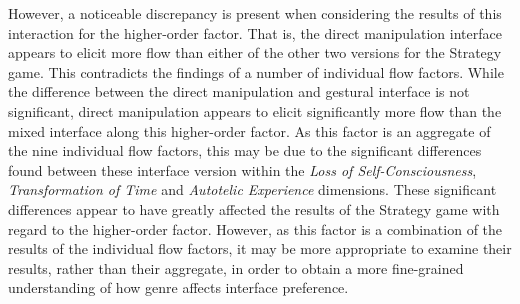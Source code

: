 However, a noticeable discrepancy is present when considering the results of this interaction for the higher-order factor. That is, the direct manipulation interface appears to elicit more flow than either of the other two versions for the Strategy game. This contradicts the findings of a number of individual flow factors. While the difference between the direct manipulation and gestural interface is not significant, direct manipulation appears to elicit significantly more flow than the mixed interface along this higher-order factor. As this factor is an aggregate of the nine individual flow factors, this may be due to the significant differences found between these interface version within the \emph{Loss of Self-Consciousness}, \emph{Transformation of Time} and \emph{Autotelic Experience} dimensions. These significant differences appear to have greatly affected the results of the Strategy game with regard to the higher-order factor. However, as this factor is a combination of the results of the individual flow factors, it may be more appropriate to examine their results, rather than their aggregate, in order to obtain a more fine-grained understanding of how genre affects interface preference.

